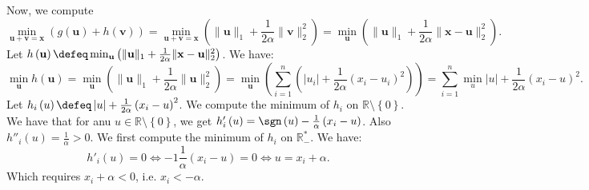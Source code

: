 \documentclass{article}
\begin{document}
\begin{itemize}
           Now, we compute
           \begin{equation*}
               \min_{\mathbf{u} + \mathbf{v} = \mathbf{x}}
               \left(g\left(\mathbf{u}\right)
               + h\left(\mathbf{v}\right)\right)
               = \min_{\mathbf{u}+\mathbf{v} = \mathbf{x}}
               \left(\|\mathbf{u}\|_{1}
               + \frac{1}{2\alpha}\|\mathbf{v}\|_{2}^{2}\right)
               = \min_{\mathbf{u}}\left(\|\mathbf{u}\|_{1}
               + \frac{1}{2\alpha}\|\mathbf{x}
               - \mathbf{u}\|^{2}_{2}\right).
           \end{equation*}
           Let $h\left(\mathbf{u}\right)
           \defeq  \min_{\mathbf{u}}\left(\|\mathbf{u}\|_{1}
           + \frac{1}{2\alpha}\|\mathbf{x}
           - \mathbf{u}\|^{2}_{2}\right)$.
           We have:
           \begin{equation*}
               \min_{\mathbf{u}} h\left(\mathbf{u}\right)=
               \min_{\mathbf{u}}
               \left(\|\mathbf{u}\|_{1}
               + \frac{1}{2\alpha}\|\mathbf{u}\|_{2}^{2}\right)
               = \min_{\mathbf{u}}
               \left(
               \sum_{i=1}^{n} \left(
               \left|u_{i}\right| + 
               \frac{1}{2\alpha}
               \left(x_{i} - u_{i}\right)^{2}
               \right)
               \right) = 
               \sum_{i=1}^{n}
               \min_{u} \left|u\right| +
               \frac{1}{2\alpha} \left(x_{i} - u\right)^{2}.
           \end{equation*}
           Let $h_{i}\left(u\right) \defeq
           \left|u\right| + \frac{1}{2\alpha}
           \left(x_{i} - u\right)^{2}$.
           We compute the minimum of
           $h_{i}$ on $\mathbb{R} \setminus \left\{0\right\}$.
           We have that for anu $u \in \mathbb{R} \setminus \left\{0\right\}$,
           we get $h'_{i}\left(u\right) =
           \sgn\left(u\right) - \frac{1}{\alpha}
           \left(x_{i} - u\right)$.
           Also $h''_{i}\left(u\right) = \frac{1}{\alpha} > 0$.
           We first compute the minimum of $h_i$ on $\mathbb{R}_{-}^{*}$.
           We have:
           \begin{equation*}
               h'_{i} \left(u\right) = 0 \Longleftrightarrow 
               -1 \frac{1}{\alpha} \left(x_{i} - u\right)=0
               \Longleftrightarrow u = x_{i} + \alpha.
           \end{equation*}
           Which requires $x_{i} + \alpha < 0$, i.e.
           $x_{i} < - \alpha$.
           

\end{itemize}
\end{document}
